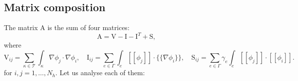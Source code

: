 \documentclass[12pt, a4paper]{article}
\theoremstyle{definition}
\theoremstyle{plain}
\theoremstyle{plain}
\theoremstyle{definition}
\begin{document}
\subsection{Matrix composition}
The matrix $\mathrm{A}$ is the sum of four matrices:
\begin{equation*}
	\mathrm{A} = \mathrm{V} - \mathrm{I} - \mathrm{I}^T + \mathrm{S},
\end{equation*}
where
\begin{equation*}
	\mathrm{V}_{ij} = \sum_{\kappa \in \mathcal{T}} \int_\kappa \nabla \phi_j \cdot \nabla \phi_i,
	\quad \mathrm{I}_{ij} = \sum_{e \in \Gamma} \int_e [\![\phi_j]\!] \cdot \{\!\!\{ \nabla \phi_i \}\!\!\},
	\quad \mathrm{S}_{ij} = \sum_{e \in \Gamma} \gamma_e \int_e [\![ \phi_j ]\!] \cdot [\![ \phi_i ]\!].
\end{equation*}
for $i,j = 1,\dots, N_h$. Let us analyse each of them:
\end{document}
